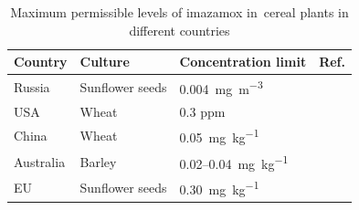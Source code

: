 \listoftables
\listoffigures

\newpage

\makeatletter
{}


\begin{table}[h] %
\footnotesize
\caption{Maximum permissible levels of imazamox in~cereal plants in different countries}\label{esmTab:MPL}
\begin{tabular}{@{}llll@{}}
\toprule
Country  & Culture  & Concentration limit & Ref.\\
\midrule
Russia     & Sunflower seeds  & 0.004~\unit{\mg\per\cubic\metre}   & \footnotemark[38]  \\
USA        & Wheat            & 0.3 ppm                            & \footnotemark[39]  \\
China      & Wheat            & 0.05~\unit{\mg\per\kilogram}       & \footnotemark[40] \\
Australia  & Barley           & 0.02--0.04~\unit{\mg\per\kilogram} & \footnotemark[41] \\
EU         & Sunflower seeds  & 0.30~\unit{\mg\per\kilogram}       & \footnotemark[42] \\
\bottomrule
\end{tabular}
\begin{flushleft}
\end{flushleft}
\end{table}





